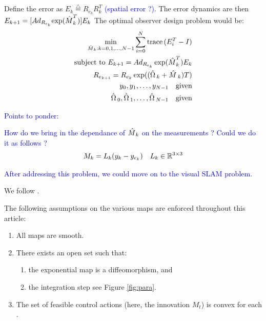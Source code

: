 \documentclass[12pt]{article}
\def\deff{\stackrel{\triangle}{=}}
\begin{document}
Define the error as $E_k \deff R_{e_k} R_{k}^T$ \textcolor{blue}{(spatial error ?)}. 
The error dynamics are then $
		E_{k+1} = [Ad_{R_{e_k}}   {\exp(\mathop{\hat{M}}_k^T) } ] E_k
$
The optimal 
observer design problem would be:
 	\begin{align}
		\min_{\mathop{\hat{M}}_k: k=0, 1, \ldots, N - 1} \sum_{i=0}^{N} \mathop{\hbox{trace}}{(E_i^T - I)}
		\nonumber \\
		\hbox{subject to $E_{k+1} = Ad_{R_{e_k}}   \exp(\mathop{\hat{M}}_k^T) E_k$}
		\nonumber \\
		R_{e_{k+1}} = R_{e_{k}} \exp (( \mathop{\hat{\Omega}}{} _k + \mathop{\hat{M}}{}_k)T)
		\nonumber \\
		y_0, y_1, \ldots, y_{N-1} \quad \hbox{given}
		\nonumber \\
		\mathop{\hat{\Omega}}{}_0, \mathop{\hat{\Omega}}{}_1, \ldots, \mathop{\hat{\Omega}}{}_{N-1} \quad \hbox{given}
	\end{align}
\textcolor{blue}{Points to ponder: 
\been
%
	\item How do we bring in the dependance of $\mathop{\hat{M}}_k$ on the measurements ?
	Could we do it as follows ? 
 	\begin{align}
		M_k = 	L_k (y_k - y_{e_k}) \quad L_k \in \mathbb{R}^{3 \times 3}
	\end{align}
	\item After addressing this problem, we could move on to the visual SLAM problem.
%
\een}
%
We follow \cite{phogat_DMP}.
%
\begin{assumption}
\label{ass:asm}
The following assumptions on the various maps are enforced throughout this article:
%
\begin{enumerate}[label=\textup{(A-\roman*)}, leftmargin=*, widest=b, align=left]
%
\item \label{asm:1} All maps are smooth.
%
\item \label{asm:2} There exists an open set  such that: 
\begin{enumerate}[label=\textup{(\alph*)}]
\item the exponential map  is a diffeomorphism, and 
\item the integration step    see Figure \ref{fig:para}.
\end{enumerate}
\item \label{asm:3} The set of feasible control actions \m{\cset} 
(here, the innovation $M_t$) is convex for each .
%
\end{enumerate} 
\end{assumption}
 
\end{document}
